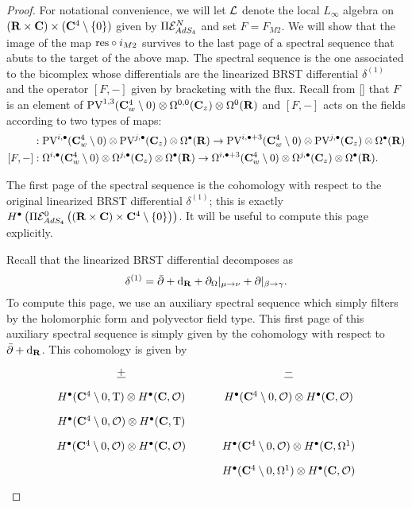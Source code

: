 \documentclass[../main.tex]{subfiles}
\begin{document}
\begin{proof}
For notational convenience, we will let $\mathcal{L}$ denote the local $L_\infty$ algebra on  $(\mathbf{R}\times \mathbf{C}) \times (\mathbf{C}^4\setminus \{0\} )$ given by $\Pi\mathcal{E}^N_{AdS_4}$ and set $F = F_{M2}$. We will show that the image of the map $\mathrm{res}\circ i_{M2}$ survives to the last page of a spectral sequence that abuts to the target of the above map. The spectral sequence is the one associated to the bicomplex whose differentials are the linearized BRST differential $\delta^{(1)}$ and the operator $[F,- ]$ given by bracketing with the flux. Recall from \ref{} that $F$ is an element of  $\text{PV}^{1,3}(\mathbf{C}_w^4 \setminus 0) \otimes \Omega^{0,0}(\mathbf{C}_z) \otimes \Omega^0(\mathbf{R})$ and $[F,-]$ acts on the fields according to two types of maps:
\begin{align*}
[F ,-] & : \PV^{i,\bullet}(\C^4_w \setminus 0) \otimes \PV^{j,\bullet} (\C_z) \otimes \Omega^\bullet (\R) \to \PV^{i,\bullet+3}(\C^4_w \setminus 0) \otimes \PV^{j,\bullet} (\C_z) \otimes \Omega^\bullet (\R) \\
[F,-] & : \Omega^{i,\bullet}(\C^4_w \setminus 0) \otimes \Omega^{j,\bullet} (\C_z) \otimes \Omega^\bullet (\R) \to \Omega^{i,\bullet+3}(\C^4_w \setminus 0) \otimes \Omega^{j,\bullet} (\C_z) \otimes \Omega^\bullet (\R).
\end{align*}

The first page of the spectral sequence is the cohomology with respect to the original linearized BRST differential $\delta^{(1)}$; this is exactly $H^\bullet \left ( \Pi \mathcal{E}^0_{AdS_4} \left ( (\mathbf{R}\times \mathbf{C}) \times \mathbf{C}^4\setminus \{0\} \right ) \right )$. It will be useful to compute this page explicitly.

Recall that the linearized BRST differential decomposes as
\[
\delta^{(1)} = \bar{\partial} + \mathrm{d}_{\mathbf{R}} + \partial_{\Omega} |_{\mu \to \nu} + \partial |_{\beta \to \gamma}  .
\]
To compute this page, we use an auxiliary spectral sequence which simply filters by the holomorphic form and polyvector field type. 
This first page of this auxiliary spectral sequence is simply given by the cohomology with respect to $\bar{\partial} + \mathrm{d}_{\mathbf{R}}$. 
This cohomology is given by
\begin{equation}
  \label{eqn:ads4ss} 
  \begin{tikzcd}[row sep = 1 ex]
    \ul{+} & \ul{-} \\
H^\bullet(\C^4\setminus 0, \T) \otimes H^\bullet(\C, \mc{O}) & H^\bullet(\C^4 \setminus 0, \mc{O}) \otimes H^\bullet(\C, \mc{O}) \\
H^\bullet(\C^4\setminus 0, \mc{O}) \otimes H^\bullet(\C, \T) \\
H^\bullet(\C^4\setminus 0, \mc{O}) \otimes H^\bullet(\C, \mc{O}) & H^\bullet(\C^4\setminus 0, \mc{O}) \otimes H^\bullet(\C, \Omega^1) \\ & H^\bullet(\C^4\setminus 0, \Omega^1) \otimes H^\bullet(\C, \mc{O})  
\end{tikzcd}
\end{equation}


\end{proof}
\end{document}
